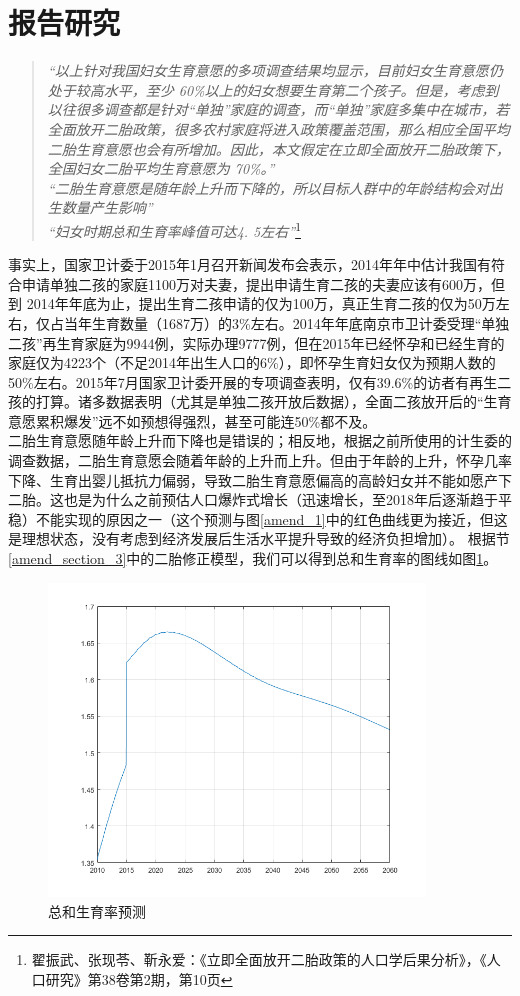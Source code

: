 \documentclass[a4paper]{article}
\begin{document}
\part{报告研究}
\label{pipan}
\begin{quote}
\textit{“以上针对我国妇女生育意愿的多项调查结果均显示，目前妇女生育意愿仍处于较高水平，至少 60\%以上的妇女想要生育第二个孩子。但是，考虑到以往很多调查都是针对“单独”家庭的调查，而“单独”家庭多集中在城市，若全面放开二胎政策，很多农村家庭将进入政策覆盖范围，那么相应全国平均二胎生育意愿也会有所增加。因此，本文假定在立即全面放开二胎政策下，全国妇女二胎平均生育意愿为 70\%。”\\
“二胎生育意愿是随年龄上升而下降的，所以目标人群中的年龄结构会对出生数量产生影响”\\
“妇女时期总和生育率峰值可达4. 5左右”}\footnote{翟振武、张现苓、靳永爱：《立即全面放开二胎政策的人口学后果分析》，《人口研究》第38卷第2期，第10页}\\
\end{quote}
\indent
事实上，国家卫计委于2015年1月召开新闻发布会表示，2014年年中估计我国有符合申请单独二孩的家庭1100万对夫妻，提出申请生育二孩的夫妻应该有600万，但到 2014年年底为止，提出生育二孩申请的仅为100万，真正生育二孩的仅为50万左右，仅占当年生育数量（1687万）的3\%左右。2014年年底南京市卫计委受理“单独二孩”再生育家庭为9944例，实际办理9777例，但在2015年已经怀孕和已经生育的家庭仅为4223个（不足2014年出生人口的6\%），即怀孕生育妇女仅为预期人数的50\%左右。2015年7月国家卫计委开展的专项调查表明，仅有39.6\%的访者有再生二孩的打算。诸多数据表明（尤其是单独二孩开放后数据），全面二孩放开后的“生育意愿累积爆发”远不如预想得强烈，甚至可能连50\%都不及。\\
\indent
二胎生育意愿随年龄上升而下降也是错误的；相反地，根据之前所使用的计生委的调查数据，二胎生育意愿会随着年龄的上升而上升。但由于年龄的上升，怀孕几率下降、生育出婴儿抵抗力偏弱，导致二胎生育意愿偏高的高龄妇女并不能如愿产下二胎。这也是为什么之前预估人口爆炸式增长（迅速增长，至2018年后逐渐趋于平稳）不能实现的原因之一（这个预测与图\ref{amend_1}中的红色曲线更为接近，但这是理想状态，没有考虑到经济发展后生活水平提升导致的经济负担增加）。
\indent
根据节\ref{amend_section_3}中的二胎修正模型，我们可以得到总和生育率的图线如图\ref{amend_fertility_rate}。
	\begin{figure}[htbp]
		\centering
		\includegraphics[width=10cm]{pics/amend_fertility_rate.png}
		\caption{总和生育率预测} 
		\label{amend_fertility_rate}	
	\end{figure}
\end{document}
